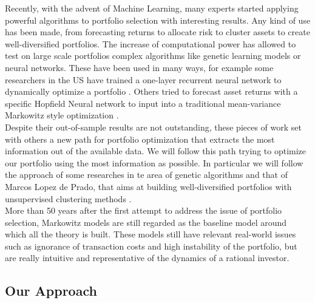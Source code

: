 \documentclass[12pt]{article} %
\numberwithin{equation}{subsection}
\begin{document}
Recently, with the advent of Machine Learning, many experts started applying powerful algorithms to portfolio selection with interesting results. Any kind of use has been made, from forecasting returns to allocate risk to cluster assets to create well-diversified portfolios. The increase of computational power has allowed to test on large scale portfolios complex algorithms like genetic learning models or neural networks. These have been used in many ways, for example some researchers in the US have trained a one-layer recurrent neural network to dynamically optimize a portfolio \cite{NN_1}. Others tried to forecast asset returns with a specific Hopfield Neural network to input into a traditional mean-variance Markowitz style optimization \cite{NN_2}.\\
Despite their out-of-sample results are not outstanding, these pieces of work set with others a new path for portfolio optimization that extracts the most information out of the available data. We will follow this path trying to optimize our portfolio using the most information as possible. In particular we will follow the approach of some researches in te area of genetic algorithms \cite{genetic_1} and that of Marcos Lopez de Prado, that aims at building well-diversified portfolios with unsupervised clustering methods \cite{HRP}.\\
More than 50 years after the first attempt to address the issue of portfolio selection, Markowitz models are still regarded as the baseline model around which all the theory is built. These models still have relevant real-world issues such as ignorance of transaction costs and high instability of the portfolio, but are really intuitive and representative of the dynamics of a rational investor.  


\subsection{Our Approach}
\end{document}
